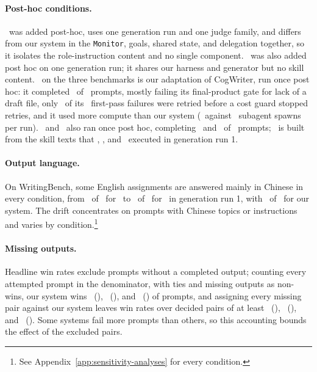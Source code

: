 \paragraph{Post-hoc conditions.}
\condStagedRoles\ was added post-hoc, uses one generation run and one judge family, and differs from our system in the \texttt{Monitor}, goals, shared state, and delegation together, so it isolates the role-instruction content and no single component.
\condPlainAgent\ was also added post hoc on one generation run; it shares our harness and generator but no skill content.
\condExploratoryOne\ on the three benchmarks is our adaptation of CogWriter, run once post hoc: it completed \CogWriterStyleCompleted\ of \CogWriterStyleAttempted\ prompts, mostly failing its final-product gate for lack of a draft file, only \CogWriterStyleRetried\ of its \CogWriterStyleFirstPassFailed\ first-pass failures were retried before a cost guard stopped retries, and it used more compute than our system (\CogWriterStyleSpawns\ against \AfourSpawns\ subagent spawns per run).
\condSelfRefine\ and \condLoopOnly\ also ran once post hoc, completing \SelfRefineCompleted\ and \LoopOnlyCompleted\ of \CogWriterStyleAttempted\ prompts; \condLoopOnly\ is built from the skill texts that \condNoGoals, \condFixedOrder, and \condSingleContext\ executed in generation run 1.

\paragraph{Output language.}
On WritingBench, some English assignments are answered mainly in Chinese in every condition, from \AtwoDriftCount\ of \AtwoDriftEnglish\ for \condStaged\ to \AfiveDriftCount\ of \AfiveDriftEnglish\ for \condNoGoals\ in generation run 1, with \AfourDriftCount\ of \AfourDriftEnglish\ for our system.
The drift concentrates on prompts with Chinese topics or instructions and varies by condition.\footnote{See Appendix~\ref{app:sensitivity-analyses} for every condition.}

\paragraph{Missing outputs.}
Headline win rates exclude prompts without a completed output; counting every attempted prompt in the denominator, with ties and missing outputs as non-wins, our system wins \UncondFullSinglePassWinShare\ (\condSinglePass), \UncondFullStagedWinShare\ (\condStaged), and \UncondFullTaskPlanningWinShare\ (\condTaskPlanning) of prompts, and assigning every missing pair against our system leaves win rates over decided pairs of at least \WorstCaseFullSinglePassRate\ (\condSinglePass), \WorstCaseFullStagedRate\ (\condStaged), and \WorstCaseFullTaskPlanningRate\ (\condTaskPlanning).
Some systems fail more prompts than others, so this accounting bounds the effect of the excluded pairs.

